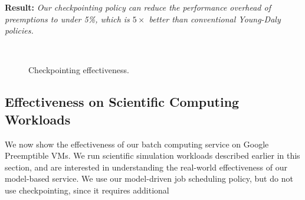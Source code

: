 \noindent \textbf{Result:} \emph{Our checkpointing policy can reduce the performance overhead of preemptions to under 5\%, which is $5\times$ better than conventional Young-Daly policies.}


\begin{figure}[t]
\\

  \caption{Checkpointing effectiveness.}
  \label{fig:ckpt-all}
\end{figure}



\subsection{Effectiveness on Scientific Computing Workloads}

We now show the effectiveness of our batch computing service on Google Preemptible VMs.
We run scientific simulation workloads described earlier in this section, and are interested in understanding the real-world effectiveness of our model-based service.
We use our model-driven job scheduling policy, but do not use checkpointing, since it requires additional 

